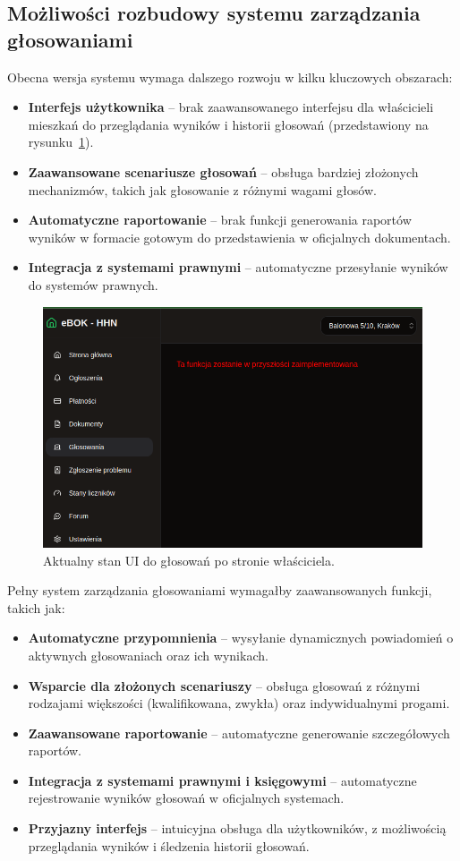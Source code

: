 \subsection{Możliwości rozbudowy systemu zarządzania głosowaniami}
Obecna wersja systemu wymaga dalszego rozwoju w kilku kluczowych obszarach:
\begin{itemize}
    \item \textbf{Interfejs użytkownika} -- brak zaawansowanego interfejsu dla właścicieli mieszkań do przeglądania wyników i historii głosowań (przedstawiony na rysunku~\ref{fig:poll_owner_ui}).
    \item \textbf{Zaawansowane scenariusze głosowań} -- obsługa bardziej złożonych mechanizmów, takich jak głosowanie z różnymi wagami głosów.
    \item \textbf{Automatyczne raportowanie} -- brak funkcji generowania raportów wyników w formacie gotowym do przedstawienia w oficjalnych dokumentach.
    \item \textbf{Integracja z systemami prawnymi} -- automatyczne przesyłanie wyników do systemów prawnych.
\end{itemize}

\begin{figure}[ht]
    \centering
    \includegraphics[width=0.63\linewidth]{rys03/poll_ui_unfinish}
    \caption{Aktualny stan UI do głosowań po stronie właściciela.}
    \label{fig:poll_owner_ui}
\end{figure}

Pełny system zarządzania głosowaniami wymagałby zaawansowanych funkcji, takich jak:
\begin{itemize}
    \item \textbf{Automatyczne przypomnienia} -- wysyłanie dynamicznych powiadomień o aktywnych głosowaniach oraz ich wynikach.
    \item \textbf{Wsparcie dla złożonych scenariuszy} -- obsługa głosowań z różnymi rodzajami większości (kwalifikowana, zwykła) oraz indywidualnymi progami.
    \item \textbf{Zaawansowane raportowanie} -- automatyczne generowanie szczegółowych raportów.
    \item \textbf{Integracja z systemami prawnymi i księgowymi} -- automatyczne rejestrowanie wyników głosowań w oficjalnych systemach.
    \item \textbf{Przyjazny interfejs} -- intuicyjna obsługa dla użytkowników, z możliwością przeglądania wyników i śledzenia historii głosowań.
\end{itemize}


